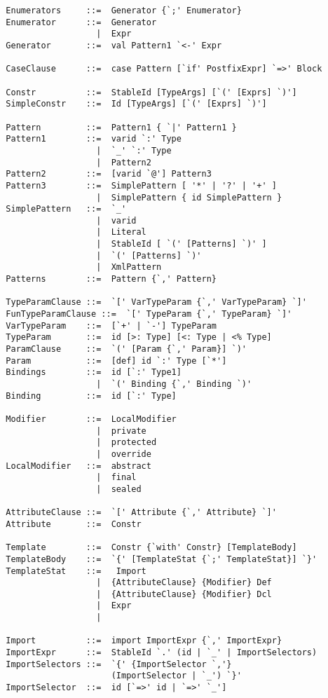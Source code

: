 \begin{lstlisting}
  Enumerators     ::=  Generator {`;' Enumerator}
  Enumerator      ::=  Generator
                    |  Expr
  Generator       ::=  val Pattern1 `<-' Expr

  CaseClause      ::=  case Pattern [`if' PostfixExpr] `=>' Block 

  Constr          ::=  StableId [TypeArgs] [`(' [Exprs] `)']  
  SimpleConstr    ::=  Id [TypeArgs] [`(' [Exprs] `)']  

  Pattern         ::=  Pattern1 { `|' Pattern1 }
  Pattern1        ::=  varid `:' Type
                    |  `_' `:' Type
                    |  Pattern2
  Pattern2        ::=  [varid `@'] Pattern3
  Pattern3        ::=  SimplePattern [ '*' | '?' | '+' ]
                    |  SimplePattern { id SimplePattern }
  SimplePattern   ::=  `_'
                    |  varid
                    |  Literal
                    |  StableId [ `(' [Patterns] `)' ]
                    |  `(' [Patterns] `)'
                    |  XmlPattern
  Patterns        ::=  Pattern {`,' Pattern}

  TypeParamClause ::=  `[' VarTypeParam {`,' VarTypeParam} `]'
  FunTypeParamClause ::=  `[' TypeParam {`,' TypeParam} `]'
  VarTypeParam    ::=  [`+' | `-'] TypeParam
  TypeParam       ::=  id [>: Type] [<: Type | <% Type]
  ParamClause     ::=  `(' [Param {`,' Param}] `)'
  Param           ::=  [def] id `:' Type [`*']
  Bindings        ::=  id [`:' Type1]
                    |  `(' Binding {`,' Binding `)'
  Binding         ::=  id [`:' Type]

  Modifier        ::=  LocalModifier
                    |  private
                    |  protected
                    |  override 
  LocalModifier   ::=  abstract
                    |  final
                    |  sealed

  AttributeClause ::=  `[' Attribute {`,' Attribute} `]'
  Attribute       ::=  Constr

  Template        ::=  Constr {`with' Constr} [TemplateBody]
  TemplateBody    ::=  `{' [TemplateStat {`;' TemplateStat}] `}'
  TemplateStat    ::=   Import
                    |  {AttributeClause} {Modifier} Def
                    |  {AttributeClause} {Modifier} Dcl
                    |  Expr
                    |

  Import          ::=  import ImportExpr {`,' ImportExpr}
  ImportExpr      ::=  StableId `.' (id | `_' | ImportSelectors)
  ImportSelectors ::=  `{' {ImportSelector `,'} 
                       (ImportSelector | `_') `}'
  ImportSelector  ::=  id [`=>' id | `=>' `_']


\end{lstlisting}
